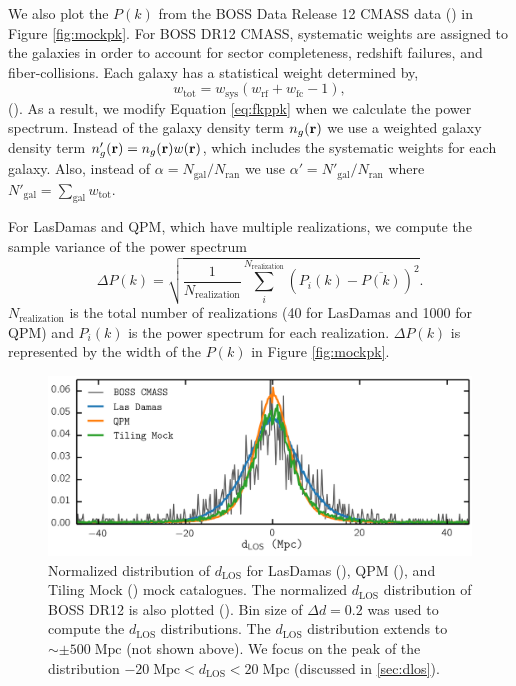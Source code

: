 \documentclass{emulateapj}
\begin{document}
We also plot the $P(k)$ from the BOSS Data Release 12 CMASS data (\cmasscolor) in Figure \ref{fig:mockpk}. For BOSS DR12 CMASS, systematic weights are assigned to the galaxies in order to account for sector completeness, redshift failures, and fiber-collisions. Each galaxy has a statistical weight determined by, 
\begin{equation} \label{eq:weight}
w_\mathrm{tot} = w_\mathrm{sys} (w_\mathrm{rf} + w_\mathrm{fc} -1), 
\end{equation} 
(\citealt{Anderson:2012aa, Beutler:2014aa}). As a result, we modify Equation \ref{eq:fkppk} when we calculate the power spectrum. Instead of the galaxy density term $n_g({\bf r})$ we use a weighted galaxy density term $n'_g({\bf r}) = n_g({\bf r}) w({\bf r})$, which includes the systematic weights for each galaxy. Also, instead of $\alpha = N_{\mathrm{gal}}/N_\mathrm{ran}$ we use $\alpha ' = N'_\mathrm{gal}/N_\mathrm{ran}$ where $N'_\mathrm{gal} = \sum_\mathrm{gal} w_\mathrm{tot}$. 

For LasDamas and QPM, which have multiple realizations, we compute the sample variance of the power spectrum
\begin{equation} \label{eq:pk_var}
\Delta P (k)= \sqrt{\frac{1}{N_\mathrm{realization}} \sum\limits_i^{N_\mathrm{realization}} (P_i(k)- \overline{P(k)})^2 }. 
\end{equation}
$N_\mathrm{realization}$ is the total number of realizations (40 for LasDamas and 1000 for QPM) and $P_i(k)$ is the power spectrum for each realization. $\Delta P(k)$ is represented by the width of the $P(k)$ in Figure \ref{fig:mockpk}. 

\begin{figure}
\begin{center}
\includegraphics[scale=0.575]{fcpaper_dlos_dist.png}
\caption{Normalized distribution of $d_{\mathrm{LOS}}$ for LasDamas (\ldgcolor), QPM (\qpmcolor), and Tiling Mock (\tmcolor) mock catalogues. The normalized $d_{\mathrm{LOS}}$ distribution of BOSS DR12 is also plotted (\cmasscolor). Bin size of $\Delta d = 0.2$ was used to compute the $d_{\mathrm{LOS}}$ distributions. The $d_\mathrm{LOS}$ distribution extends to $\sim \pm 500 \; \mathrm{Mpc}$ (not shown above). We focus on the peak of the distribution $-20 \; \mathrm{Mpc} < d_\mathrm{LOS} < 20 \;\mathrm{Mpc}$ (discussed in \ref{sec:dlos}).} \label{fig:d_los}
\end{center}
\end{figure}
\end{document}
